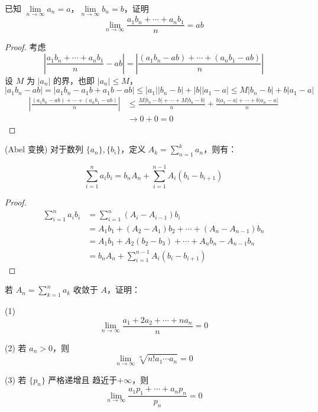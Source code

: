\begin{example}
	已知 $\lim\limits_{n \to \infty} a_n = a$，$\lim\limits_{n \to \infty} b_n = b$，证明
	\[
	\lim_{n \to \infty} \dfrac{a_1 b_n + \cdots + a_n b_1}{n} = ab
	\]
\end{example}
\begin{proof}
	考虑 $$\left| \dfrac{a_1 b_n + \cdots + a_n b_1}{n} - ab \right| = \left| \frac{(a_1 b_n - ab) + \cdots + (a_n b_1 - ab)}{n} \right|$$
	设 $M$ 为 $|a_n|$ 的界，也即 $|a_n| \leqslant M$，
	\[
	|a_1 b_n - ab| = |a_1 b_n - a_1 b + a_1 b - ab| \leqslant |a_1||b_n - b| + |b||a_1 - a| \leqslant M |b_n - b| + b |a_1 - a|
	\]
	$$\begin{aligned}
		\left| \frac{(a_1 b_n - ab) + \cdots + (a_n b_1 - ab)}{n} \right| &\leqslant \frac{M |b_n - b| + \cdots + M |b_n - b|}{n} + \frac{b |a_1 - a| + \cdots + b |a_n - a|}{n}\\&\to 0 + 0 = 0
	\end{aligned}$$
\end{proof}
\begin{proposition} (Abel 变换)
	对于数列 $\{a_n\}, \{b_i\}$，定义 $A_k = \sum\limits_{n=1}^k a_n$，则有：
	
	\[
	\sum_{i=1}^n a_i b_i = b_n A_n + \sum_{i=1}^{n-1} A_i (b_i - b_{i+1})
	\]
	\label{Abeltra}
\end{proposition}
\begin{proof}
	\begin{align*}
		\sum_{i=1}^n a_i b_i &= \sum_{i=1}^n (A_i - A_{i-1}) b_i \\
		&= A_1 b_1 + (A_2 - A_1) b_2 + \cdots + (A_n - A_{n-1}) b_n \\
		&= A_1 b_1 + A_2 (b_2 - b_3) + \cdots + A_n b_n - A_{n-1} b_n \\
		&= b_n A_n + \sum_{i=1}^{n-1} A_i (b_i - b_{i+1})
	\end{align*}
	
\end{proof}
\begin{example}
	
	若 $A_n = \sum\limits_{k=1}^n a_k$ 收敛于 $A$，证明：
	
	(1)
	\[
	\lim_{n \to \infty} \frac{a_1 + 2a_2 + \cdots + n a_n}{n} = 0
	\]
	
	(2) 若 $a_n>0$，则
	\[
	\lim_{n \to \infty} \sqrt[n]{n!a_1 \cdots a_n} = 0
	\]
	
	(3) 若 $\{p_n\}$ 严格递增且 趋近于$ +\infty$，则
	\[
	\lim_{n \to \infty} \frac{a_1 p_1 + \cdots + a_n p_n}{p_n} = 0
	\]
	
\end{example}



